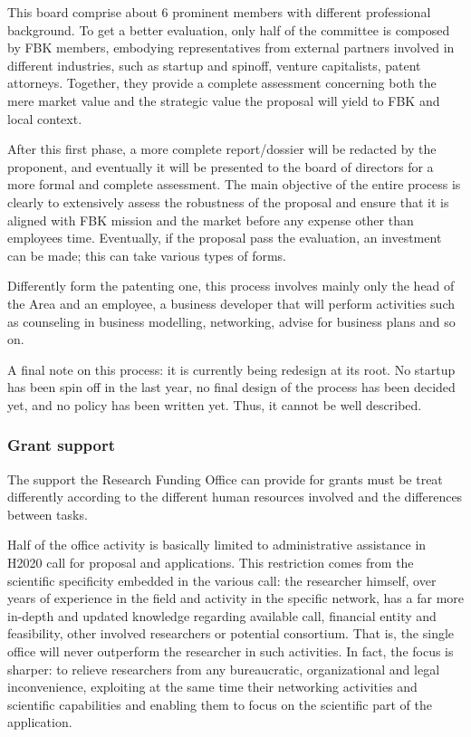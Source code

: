 This board comprise about 6 prominent members with different professional background. To get a better evaluation, only half of the committee is composed by FBK members, embodying representatives from external partners involved in different industries, such as startup and spinoff, venture capitalists, patent attorneys. Together, they provide a complete assessment concerning both the mere market value and the strategic value the proposal will yield to FBK and local context.

After this first phase, a more complete report/dossier will be redacted by the proponent, and eventually it will be presented to the board of directors for a more formal and complete assessment. The main objective of the entire process is clearly to extensively assess the robustness of the proposal and ensure that it is aligned with FBK mission and the market before any expense other than employees time. Eventually, if the proposal pass the evaluation, an investment can be made; this can take various types of forms.

Differently form the patenting one, this process involves mainly only the head of the Area and an employee, a business developer that will perform activities such as counseling in business modelling, networking, advise for business plans and so on. 

A final note on this process: it is currently being redesign at its root. No startup has been spin off in the last year, no final design of the process has been decided yet, and no policy has been written yet. Thus, it cannot be well described. 

\subsubsection{Grant support}

The support the Research Funding Office can provide for grants must be treat differently according to the different human resources involved and the differences between tasks.

Half of the office activity is basically limited to administrative assistance in H2020 call for proposal and applications. This restriction comes from the scientific specificity embedded in the various call: the researcher himself, over years of experience in the field and activity in the specific network, has a far more in-depth and updated knowledge regarding available call, financial entity and feasibility, other involved researchers or potential consortium. That is, the single office will never outperform the researcher in such activities. In fact, the focus is sharper: to relieve researchers from any bureaucratic, organizational and legal inconvenience, exploiting at the same time their networking activities and scientific capabilities and enabling them to focus on the scientific part of the application.

